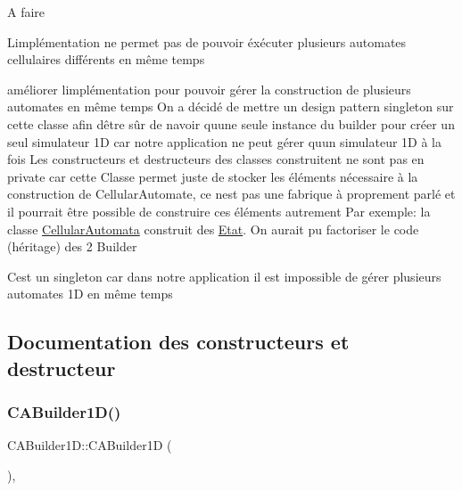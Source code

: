 \begin{DoxyRefDesc}{A faire}
\item[\mbox{\hyperlink{todo__todo000002}{A faire}}]L\textquotesingle{}implémentation ne permet pas de pouvoir éxécuter plusieurs automates cellulaires différents en même temps 

améliorer l\textquotesingle{}implémentation pour pouvoir gérer la construction de plusieurs automates en même temps On a décidé de mettre un design pattern singleton sur cette classe afin d\textquotesingle{}être sûr de n\textquotesingle{}avoir qu\textquotesingle{}une seule instance du builder pour créer un seul simulateur 1D car notre application ne peut gérer qu\textquotesingle{}un simulateur 1D à la fois Les constructeurs et destructeurs des classes construitent ne sont pas en private car cette Classe permet juste de stocker les éléments nécessaire à la construction de Cellular\+Automate, ce n\textquotesingle{}est pas une fabrique à proprement parlé et il pourrait être possible de construire ces éléments autrement Par exemple\+: la classe \mbox{\hyperlink{class_cellular_automata}{Cellular\+Automata}} construit des \mbox{\hyperlink{class_etat}{Etat}}. On aurait pu factoriser le code (héritage) des 2 Builder\end{DoxyRefDesc}


C\textquotesingle{}est un singleton car dans notre application il est impossible de gérer plusieurs automates 1D en même temps 

\subsection{Documentation des constructeurs et destructeur}
\mbox{\label{class_c_a_builder1_d_a8ce449e2418a22e39cf517baffde61de}} 
\subsubsection{\texorpdfstring{C\+A\+Builder1\+D()}{CABuilder1D()}\hspace{0.1cm}{\footnotesize\ttfamily [1/2]}}
{\footnotesize\ttfamily C\+A\+Builder1\+D\+::\+C\+A\+Builder1D (\begin{DoxyParamCaption}{ }\end{DoxyParamCaption})\hspace{0.3cm}{\ttfamily [inline]}, {\ttfamily [private]}}

